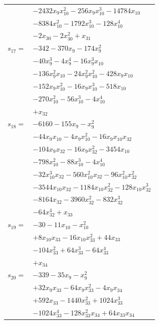 \begin{longtable}{@{}r@{\;}l@{}}
 & \(\displaystyle -2432x_{9}x_{10}^{2} -256x_{9}x_{10}^{3} -14784x_{10}\) \\
 & \(\displaystyle -8384x_{10}^{2} -1792x_{10}^{3} -128x_{10}^{4}\) \\
 & \(\displaystyle -2x_{30} -2x_{30}^{2} +x_{31}\) \\[3pt]
\(s_{17}=\) & \(\displaystyle -342 -370x_{9} -174x_{9}^{2}\) \\
 & \(\displaystyle -40x_{9}^{3} -4x_{9}^{4} -16x_{9}^{3}x_{10}\) \\
 & \(\displaystyle -136x_{9}^{2}x_{10} -24x_{9}^{2}x_{10}^{2} -428x_{9}x_{10}\) \\
 & \(\displaystyle -152x_{9}x_{10}^{2} -16x_{9}x_{10}^{3} -518x_{10}\) \\
 & \(\displaystyle -270x_{10}^{2} -56x_{10}^{3} -4x_{10}^{4}\) \\
 & \(\displaystyle +x_{32}\) \\[3pt]
\(s_{18}=\) & \(\displaystyle -6160 -155x_{9} -x_{9}^{2}\) \\
 & \(\displaystyle -44x_{9}x_{10} -4x_{9}x_{10}^{2} -16x_{9}x_{10}x_{32}\) \\
 & \(\displaystyle -104x_{9}x_{32} -16x_{9}x_{32}^{2} -3454x_{10}\) \\
 & \(\displaystyle -798x_{10}^{2} -88x_{10}^{3} -4x_{10}^{4}\) \\
 & \(\displaystyle -32x_{10}^{3}x_{32} -560x_{10}^{2}x_{32} -96x_{10}^{2}x_{32}^{2}\) \\
 & \(\displaystyle -3544x_{10}x_{32} -1184x_{10}x_{32}^{2} -128x_{10}x_{32}^{3}\) \\
 & \(\displaystyle -8164x_{32} -3960x_{32}^{2} -832x_{32}^{3}\) \\
 & \(\displaystyle -64x_{32}^{4} +x_{33}\) \\[3pt]
\(s_{19}=\) & \(\displaystyle -30 -11x_{10} -x_{10}^{2}\) \\
 & \(\displaystyle +8x_{10}x_{33} -16x_{10}x_{33}^{2} +44x_{33}\) \\
 & \(\displaystyle -104x_{33}^{2} +64x_{33}^{3} -64x_{33}^{4}\) \\
 & \(\displaystyle +x_{34}\) \\[3pt]
\(s_{20}=\) & \(\displaystyle -339 -35x_{9} -x_{9}^{2}\) \\
 & \(\displaystyle +32x_{9}x_{33} -64x_{9}x_{33}^{2} -4x_{9}x_{34}\) \\
 & \(\displaystyle +592x_{33} -1440x_{33}^{2} +1024x_{33}^{3}\) \\
 & \(\displaystyle -1024x_{33}^{4} -128x_{33}^{2}x_{34} +64x_{33}x_{34}\) \\

\end{longtable}
